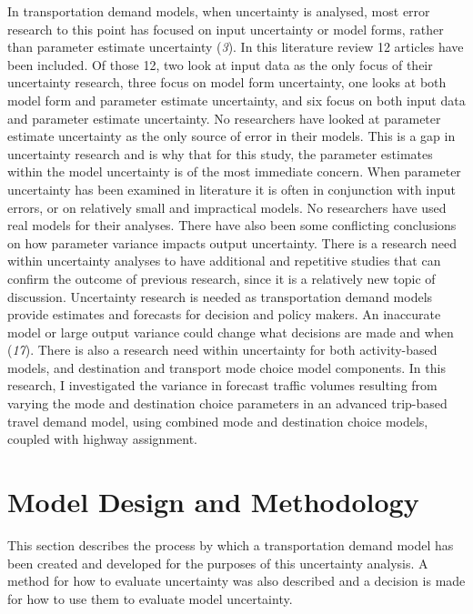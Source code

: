\documentclass[
  letterpaper,
]{trb}
\begin{document}
In transportation demand models, when uncertainty is analysed, most
error research to this point has focused on input uncertainty or model
forms, rather than parameter estimate uncertainty (\emph{3}). In this
literature review 12 articles have been included. Of those 12, two look
at input data as the only focus of their uncertainty research, three
focus on model form uncertainty, one looks at both model form and
parameter estimate uncertainty, and six focus on both input data and
parameter estimate uncertainty. No researchers have looked at parameter
estimate uncertainty as the only source of error in their models. This
is a gap in uncertainty research and is why that for this study, the
parameter estimates within the model uncertainty is of the most
immediate concern. When parameter uncertainty has been examined in
literature it is often in conjunction with input errors, or on
relatively small and impractical models. No researchers have used real
models for their analyses. There have also been some conflicting
conclusions on how parameter variance impacts output uncertainty. There
is a research need within uncertainty analyses to have additional and
repetitive studies that can confirm the outcome of previous research,
since it is a relatively new topic of discussion. Uncertainty research
is needed as transportation demand models provide estimates and
forecasts for decision and policy makers. An inaccurate model or large
output variance could change what decisions are made and when
(\emph{17}). There is also a research need within uncertainty for both
activity-based models, and destination and transport mode choice model
components. In this research, I investigated the variance in forecast
traffic volumes resulting from varying the mode and destination choice
parameters in an advanced trip-based travel demand model, using combined
mode and destination choice models, coupled with highway assignment.


\hypertarget{sec-methods}{%
\section{Model Design and Methodology}\label{sec-methods}}

This section describes the process by which a transportation demand
model has been created and developed for the purposes of this
uncertainty analysis. A method for how to evaluate uncertainty was also
described and a decision is made for how to use them to evaluate model
uncertainty.
\end{document}
